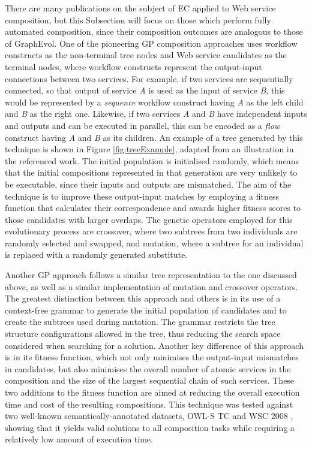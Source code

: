 \documentclass{article}
\begin{document}
There are many publications on the subject of EC applied to Web service composition, but this Subsection will focus on those which perform fully automated composition,
since their composition outcomes are analogous to those of GraphEvol. One of the pioneering GP composition approaches \cite{aversano2006genetic} uses workflow constructs as the non-terminal tree nodes and Web service candidates as the terminal nodes, where workflow constructs represent the output-input connections between
two services. For example, if two services are sequentially connected, so that output of service \textit{A} is used as the input of service \textit{B}, this would be represented
by a \textit{sequence} workflow construct having \textit{A} as the left child and \textit{B} as the right one. Likewise, if two services \textit{A} and \textit{B} have independent inputs and outputs and can be executed in parallel, this can be encoded as a \textit{flow} construct having \textit{A} and \textit{B} as its children. An example of a tree generated by this technique is shown in Figure \ref{fig:treeExample}, adapted from an illustration in the referenced work. The initial population is initialised randomly, which means that the initial compositions represented in that generation are very unlikely to be executable, since their inputs and outputs are mismatched. The aim of the technique is to improve these output-input matches by employing a fitness function that calculates their correspondence and awards higher fitness scores to those candidates with larger overlaps. The genetic operators employed for this evolutionary process are crossover, where two subtrees from two individuals are randomly selected and swapped, and mutation, where a subtree for an individual is replaced with a randomly generated substitute.

Another GP approach \cite{rodriguez2010composition} follows a similar tree representation to the one discussed above, as well as a similar implementation of mutation and crossover operators. The greatest distinction between this approach and others is in its use of a context-free grammar to generate the initial population of candidates and to create the subtrees used during mutation. The grammar restricts the tree structure configurations allowed in the tree, thus reducing the search space considered when searching for a solution. Another key difference of this approach is in its fitness function, which not only minimises the output-input mismatches in candidates, but also minimises the overall number of atomic services in the composition and the size of the largest sequential chain of such services. These two additions to the fitness function are aimed at reducing the overall execution time and cost of the resulting compositions. This technique was tested against two well-known semantically-annotated datasets, OWL-S TC \cite{kuster2008opossum} and WSC 2008 \cite{bansal2008wsc}, showing that it yields valid solutions to all composition tasks while requiring a relatively low amount of execution time.
\end{document}
